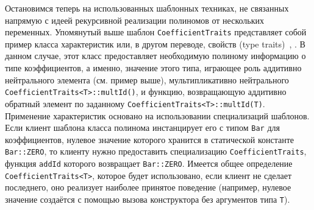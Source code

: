 \documentclass[14pt]{extarticle}
\begin{document}
Остановимся теперь на использованных шаблонных техниках, не связанных напрямую с
идеей рекурсивной реализации полиномов от нескольких переменных. Упомянутый выше
шаблон \lstinline$CoefficientTraits$ представляет собой пример класса
характеристик или, в другом переводе, свойств 
(type traits)~\cite[гл.~15]{VJ03}, \cite[п.~2.10]{Alexandrescu02}. В данном
случае, этот класс предоставляет необходимую полиному информацию о типе коэффициентов,
а именно, значение этого типа, играющее роль аддитивно нейтрального элемента
(см. пример выше), мультипликативно нейтрального
\lstinline$CoefficientTraits<T>::multId()$, и функцию, возвращающую аддитивно
обратный элемент по заданному \lstinline$CoefficientTraits<T>::multId(T)$.
Применение характеристик основано на использовании специализаций шаблонов. Если
клиент шаблона класса полинома инстанцирует его с типом \lstinline$Bar$ для
коэффициентов, нулевое значение которого хранится в статической константе
\lstinline$Bar::ZERO$, то клиенту нужно предоставить специализацию
\lstinline$CoefficientTraits$, функция \lstinline$addId$ которого возвращает
\lstinline$Bar::ZERO$. Имеется общее определение
\lstinline$CoefficientTraits<T>$, которое будет использовано, 
если клиент не сделает последнего, оно реализует наиболее принятое поведение
(например, нулевое значение создаётся с помощью вызова конструктора без
аргументов типа \lstinline$T$).
\end{document}

